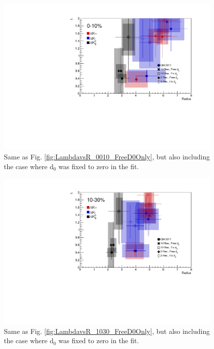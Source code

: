 \documentclass[../AnalysisNoteJBuxton.tex]{subfiles}
\begin{document}
\begin{figure}[h]
  \centering
  \includegraphics[width=\textwidth]{7_ResultsAndDiscussion/Figures/CompareAllRadiusvsLambdaAcrossAnalyses_0010_10ResAnd3Res_10and3SeparateOnly_FreeAndFixedD0.pdf}
  \caption[$\lambda$ vs. R (0-10\% Centrality) (free and fixed d$_{0}$)]{Same as Fig. \ref{fig:LambdavsR_0010_FreeD0Only}, but also including the case where d$_{0}$ was fixed to zero in the fit.}
  \label{fig:LambdavsR_0010_FreeAndFixedD0}
\end{figure}

\begin{figure}[h]
  \centering
  \includegraphics[width=\textwidth]{7_ResultsAndDiscussion/Figures/CompareAllRadiusvsLambdaAcrossAnalyses_1030_10ResAnd3Res_10and3SeparateOnly_FreeAndFixedD0.pdf}
  \caption[$\lambda$ vs. R (10-30\% Centrality) (free and fixed d$_{0}$)]{Same as Fig. \ref{fig:LambdavsR_1030_FreeD0Only}, but also including the case where d$_{0}$ was fixed to zero in the fit.}
  \label{fig:LambdavsR_1030_FreeAndFixedD0}
\end{figure}
\end{document}
